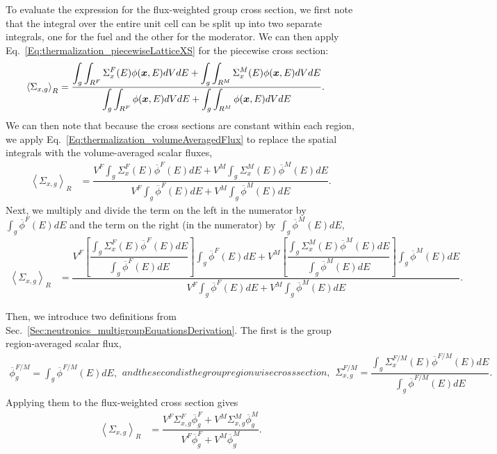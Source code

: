 To evaluate the expression for the flux-weighted group cross section, we first note that the integral over the entire unit cell can be split up into two separate integrals, one for the fuel and the other for the moderator. We can then apply Eq.~\eqref{Eq:thermalization_piecewiseLatticeXS} for the piecewise cross section:
\begin{align}
  \left< \Sigma_{x,g} \right>_R &= \dfrac{ \displaystyle\int_g \int_{R^F} \Sigma_x^F(E) \phi(\bm{x},E) dV dE + \displaystyle\int_g \int_{R^M} \Sigma_x^M(E) \phi(\bm{x},E) dV dE }{ \displaystyle\int_g \int_{R^F} \phi(\bm{x},E) dV dE + \displaystyle\int_g \int_{R^M} \phi(\bm{x},E) dV dE }. \nonumber
\end{align}
We can then note that because the cross sections are constant within each region, we apply Eq.~\eqref{Eq:thermalization_volumeAveragedFlux} to replace the spatial integrals with the volume-averaged scalar fluxes,
\begin{align}
  \left< \Sigma_{x,g} \right>_R &= \dfrac{ V^F \displaystyle\int_g \Sigma_x^F(E) \overline{\phi}^F(E) dE + V^M \int_g \Sigma_x^M(E) \overline{\phi}^M(E) dE }{ V^F \displaystyle\int_g \overline{\phi}^F(E) dE + V^M \int_g \overline{\phi}^M(E) dE }. \nonumber
\end{align}
Next, we multiply and divide the term on the left in the numerator by $\int_g \overline{\phi}^F(E) dE$ and the term on the right (in the numerator) by $\int_g \overline{\phi}^M(E) dE$,
\begin{align}
  \left< \Sigma_{x,g} \right>_R &= \dfrac{ V^F \left[ \dfrac{\displaystyle\int_g \Sigma_x^F(E) \overline{\phi}^F(E) dE}{ \displaystyle\int_g \overline{\phi}^F(E) dE } \right] \displaystyle\int_g \overline{\phi}^F(E) dE + V^M \left[ \dfrac{\displaystyle\int_g \Sigma_x^M(E) \overline{\phi}^M(E) dE}{ \displaystyle\int_g \overline{\phi}^M(E) dE } \right] \displaystyle\int_g \overline{\phi}^M(E) dE }{ V^F \displaystyle\int_g \overline{\phi}^F(E) dE + V^M \int_g \overline{\phi}^M(E) dE }. \nonumber
\end{align}

Then, we introduce two definitions from Sec.~\ref{Sec:neutronics_multigroupEquationsDerivation}. The first is the group region-averaged scalar flux,
\begin{subequations}
\begin{align}
  \overline{\phi}_g^{F/M} = \int_g \overline{\phi}^{F/M}(E) dE, 
\end{align}
and the second is the group regionwise cross section,
\begin{align}
  \Sigma_{x,g}^{F/M} = \dfrac{\displaystyle\int_g \Sigma_x^{F/M}(E) \overline{\phi}^{F/M}(E) dE}{ \displaystyle\int_g \overline{\phi}^{F/M}(E) dE } .
\end{align}
\end{subequations}
Applying them to the flux-weighted cross section gives
\begin{align}
  \left< \Sigma_{x,g} \right>_R &= \dfrac{ V^F \Sigma_{x,g}^F \overline{\phi}_g^F + V^M \Sigma_{x,g}^M \overline{\phi}_g^M }{ V^F \overline{\phi}_g^F + V^M \overline{\phi}_g^M }. \nonumber
\end{align}

